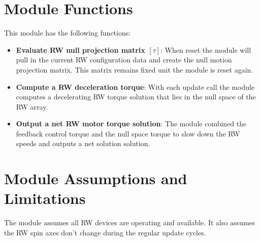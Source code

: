 

\section{Module Functions}
This module has the following functions:
\begin{itemize}
	\item \textbf{Evaluate RW null projection matrix $[\tau]$}: When reset the module will pull in the current RW configuration data and create the null motion projection matrix.  This matrix remains fixed unit the module is reset again.
	\item \textbf{Compute a RW deceleration torque}: With each update call the module computes a decelerating RW torque solution that lies in the null space of the RW array.
	\item \textbf{Output a net RW motor torque solution}:  The module combined the feedback control torque and the null space torque to slow down the RW speeds and outputs a net solution solution.
\end{itemize}

\section{Module Assumptions and Limitations}
The module assumes all RW devices are operating and available.  It also assumes the RW spin axes don't change during the regular update cycles.  